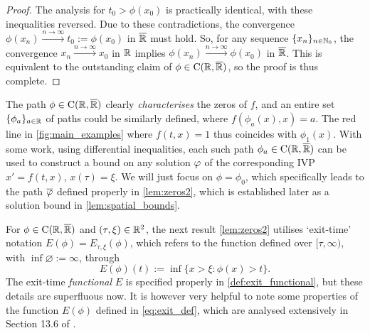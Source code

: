 \begin{proof}
    The analysis for $t_0>\phi(x_0)$ is practically identical, with these inequalities reversed. Due to these contradictions, the convergence $\phi(x_n)\xrightarrow{n\to\infty}t_0:=\phi(x_0)$ in ${\overline{\mathbb{R}}}$ must hold. So, for any sequence $\{x_n\}_{n\in\mathbb{N}_0}$, the convergence $x_n\xrightarrow{n\to\infty}x_0$ in $\mathbb{R}$ implies $\phi(x_n)\xrightarrow{n\to\infty}\phi(x_0)$ in ${\overline{\mathbb{R}}}$. This is equivalent to the outstanding claim of $\phi\in\mathrm{C}(\mathbb{R},{\overline{\mathbb{R}}})$, so the proof is thus complete.
\end{proof}

The path $\phi\in\mathrm{C}(\mathbb{R},{\overline{\mathbb{R}}})$ clearly \emph{characterises} the zeros of $f$, and an entire set $\{\phi_a\}_{a\in\mathbb{R}}$ of paths could be similarly defined, where $f(\phi_a(x),x)=a$. The red line in \autoref{fig:main_examples} where $f(t,x)=1$ thus coincides with $\phi_1(x)$. With some work, using differential inequalities, each such path $\phi_a\in\mathrm{C}(\mathbb{R},{\overline{\mathbb{R}}})$ can be used to construct a bound on any solution $\varphi$ of the corresponding IVP $x'=f(t,x)$, $x(\tau)=\xi$. We will just focus on $\phi = \phi_0$, which specifically leads to the path $\overline{\varphi}$ defined properly in \autoref{lem:zeros2}, which is established later as a solution bound in \autoref{lem:spatial_bounds}.

For $\phi\in\mathrm{C}(\mathbb{R},{\overline{\mathbb{R}}})$ and $(\tau,\xi)\in\mathbb{R}^2$, the next result \autoref{lem:zeros2} utilises `exit-time' notation $E(\phi) = E_{\tau,\xi}(\phi)$, which refers to the function defined over $[\tau,\infty)$, with $\inf\varnothing:=\infty$, through
\begin{equation}\label{eq:exit_def}
    E(\phi)(t) := \inf\{x>\xi:\phi(x)>t\}.
\end{equation}
The exit-time \emph{functional} $E$ is specified properly in \autoref{def:exit_functional}, but these details are superfluous now. It is however very helpful to note some properties of the function $E(\phi)$ defined in \autoref{eq:exit_def}, which are analysed extensively in Section 13.6 of \cite{whitt_2002}.

